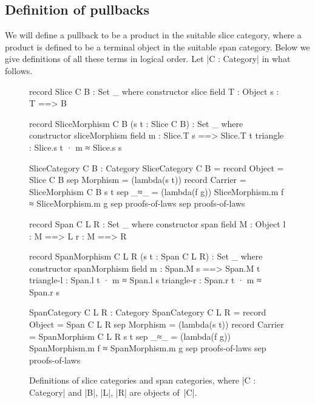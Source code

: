 \subsection{Definition of pullbacks}

We will define a pullback to be a product in the suitable slice category, where a product is defined to be a terminal object in the suitable span category.
Below we give definitions of all these terms in logical order.
Let |C : Category| in what follows.

\begin{figure}[t]
\begin{code}
record Slice C B : Set _ where
  constructor slice
  field
    T  :  Object
    s  :  T ==> B

record SliceMorphism C B (s t : Slice C B) : Set _ where
  constructor sliceMorphism
  field
    m : Slice.T s ==> Slice.T t
    triangle  :  Slice.s t · m ≈ Slice.s s

SliceCategory C B : Category
SliceCategory C B =
  record
    {    Object    =  Slice C B
    sep  Morphism  =
           (lambda(s t))  record
                            {    Carrier = SliceMorphism C B s t
                            sep  _≈_ = (lambda(f g))  SliceMorphism.m f ≈
                                                      SliceMorphism.m g
                            sep proofs-of-laws }
    sep  proofs-of-laws }

record Span C L R : Set _ where
  constructor span
  field
    M  :  Object
    l  :  M ==> L
    r  :  M ==> R

record SpanMorphism C L R (s t : Span C L R) : Set _ where
  constructor spanMorphism
  field
    m : Span.M s ==> Span.M t
    triangle-l  :  Span.l  t · m ≈ Span.l  s
    triangle-r  :  Span.r  t · m ≈ Span.r  s

SpanCategory C L R : Category
SpanCategory C L R =
  record
    {    Object    =  Span C L R
    sep  Morphism  =
           (lambda(s t))  record
                            {    Carrier = SpanMorphism C L R s t
                            sep  _≈_ = (lambda(f g))  SpanMorphism.m f ≈
                                                      SpanMorphism.m g
                            sep proofs-of-laws }
    sep  proofs-of-laws }
\end{code}
\caption{Definitions of slice categories and span categories, where |C : Category| and |B|, |L|, |R| are objects of~|C|.}
\label{fig:slice-and-span}
\end{figure}

